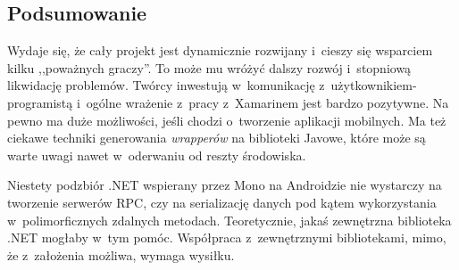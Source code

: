 \subsection{Podsumowanie}
Wydaje się, że cały projekt jest dynamicznie rozwijany i~cieszy się wsparciem kilku ,,poważnych graczy''. To może mu wróżyć dalszy rozwój i~stopniową likwidację problemów.
Twórcy inwestują w~komunikację z~użytkownikiem-programistą i~ogólne wrażenie z~pracy z~Xamarinem jest bardzo pozytywne.
Na pewno ma duże możliwości, jeśli chodzi o~tworzenie aplikacji mobilnych.
Ma też ciekawe techniki generowania \emph{wrapperów} na biblioteki Javowe, które może są warte uwagi nawet w~oderwaniu od reszty środowiska.

Niestety podzbiór .NET wspierany przez Mono na Androidzie nie wystarczy na tworzenie serwerów RPC, czy na serializację danych pod kątem wykorzystania w~polimorficznych zdalnych metodach. Teoretycznie, jakaś zewnętrzna biblioteka .NET mogłaby w~tym pomóc.
Współpraca z~zewnętrznymi bibliotekami, mimo, że z~założenia możliwa, wymaga wysiłku.

%

%
%



